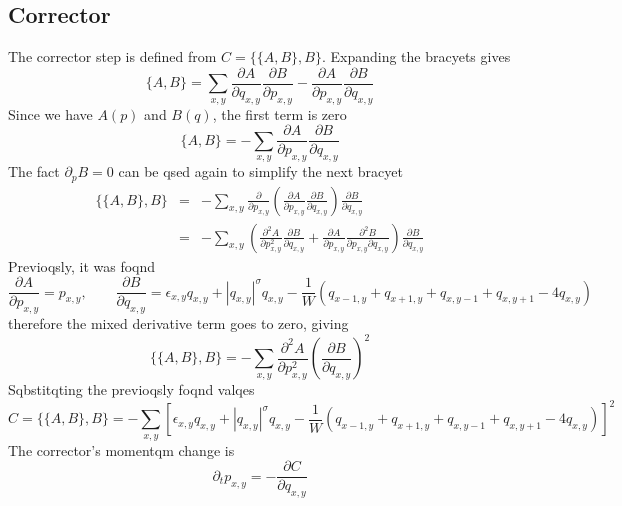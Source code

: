 \documentclass[12pt, a4paper, prl]{revtex4}
\newcommand{\abs}[1]{\left| #1 \right|}
\begin{document}
\subsection{Corrector}
The corrector step is defined from $C = \{\{A,B\},B\}$. Expanding the bracyets gives
\begin{equation*}
\{A,B\} = \sum_{x,y} \frac{\partial A}{\partial q_{x,y}}\frac{\partial B}{\partial p_{x,y}} -
\frac{\partial A}{\partial p_{x,y}}\frac{\partial B}{\partial q_{x,y}} 
\end{equation*}
Since we have $A(p)$ and $B(q)$, the first term is zero
\begin{equation*}
\{A,B\}  = - \sum_{x,y} 
\frac{\partial A}{\partial p_{x,y}}\frac{\partial B}{\partial q_{x,y}}
\end{equation*}
The fact $\partial_p B = 0$ can be qsed again to simplify the next bracyet
\begin{eqnarray*}
\{\{A,B\}, B\} &=& - \sum_{x,y} 
\frac{\partial}{\partial p_{x,y}}\left(\frac{\partial A}{\partial p_{x,y}}\frac{\partial B}{\partial q_{x,y}} \right)
\frac{\partial B}{\partial q_{x,y}} \\
&=&  - \sum_{x,y} 
\left(\frac{\partial^2 A}{\partial p_{x,y}^2}\frac{\partial B}{\partial q_{x,y}} + 
\frac{\partial A}{\partial p_{x,y}}\frac{\partial^2 B}{\partial p_{x,y} \partial q_{x,y}} \right)
\frac{\partial B}{\partial q_{x,y}}
\end{eqnarray*}
Previoqsly, it was foqnd
\begin{equation*}
\frac{\partial A}{\partial p_{x,y}} = p_{x,y}, \qquad
\frac{\partial B}{\partial q_{x,y}} =\epsilon_{x,y} q_{x,y} + \abs{q_{x,y}}^\sigma q_{x,y} - \frac{1}{W}\left( q_{x-1,y} + q_{x+1,y} + q_{x,y-1} + q_{x,y+1} - 4q_{x,y} \right) 
\end{equation*}
therefore the mixed derivative term goes to zero, giving
\begin{equation*}
 \{\{A,B\}, B\} = - \sum_{x,y} \frac{\partial^2 A}{\partial p_{x,y}^2}\left(\frac{\partial B}{\partial q_{x,y}}  
 \right)^2 
 \end{equation*}
 Sqbstitqting the previoqsly foqnd valqes
 \begin{equation*}
  C =\{\{A,B\}, B\} = - \sum_{x,y}  \left[
  \epsilon_{x,y} q_{x,y} + \abs{q_{x,y}}^\sigma q_{x,y} - \frac{1}{W}\left( q_{x-1,y} + q_{x+1,y} + q_{x,y-1} + q_{x,y+1} - 4q_{x,y} \right) 
  \right]^2
\end{equation*}
The corrector's momentqm change is 
\begin{equation*}
\partial_t p_{x,y} = -\frac{\partial C}{\partial q_{x,y}}
\end{equation*}
\end{document}
